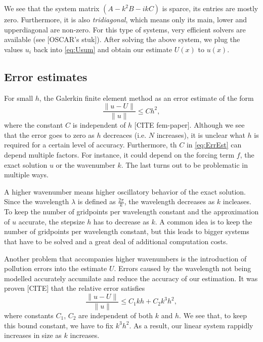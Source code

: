 \documentclass[a4paper]{article}
\begin{document}
We see that the system matrix $(A - k^2 B - i k C)$ is sparce, its
entries are mostly zero. Furthermore, it is also \emph{tridiagonal},
which means only its main, lower and upperdiagonal are non-zero. For
this type of systems, very efficient solvers are available (see
[OSCAR's stuk]). After solving the above system, we plug the values
$u_i$ back into \eqref{eq:Usum} and obtain our estimate $U(x)$ to
$u(x)$.

\subsection{Error estimates}

For small $h$, the Galerkin finite element method as an error estimate
of the form
\begin{equation} \label{eq:ErrEst}
  \frac{\lVert u - U \rVert}{\lVert u \rVert} \leq C h^2,
\end{equation}
where the constant $C$ is independent of $h$ \cite{}[CITE fem-paper].
Although we see that the error goes to zero as $h$ decreaces (i.e. $N$
increases), it is unclear what $h$ is required for a certain level of
accuracy. Furthermore, th $C$ in \eqref{eq:ErrEst} can depend multiple
factors. For instance, it could depend on the forcing term $f$, the
exact solution $u$ or the wavenumber $k$. The last turns out to be
problematic in multiple ways.

A higher wavenumber means higher oscillatory behavior of the exact
solution. Since the wavelength $\lambda$ is defined as
$\frac{2\pi}{k}$, the wavelength decreases as $k$ incleases. To keep
the number of gridpoints per wavelength constant and the approximation
of $u$ accurate, the stepsize $h$ has to decrease as $k$. A common
idea is to keep the number of gridpoints per wavelength constant, but
this leads to bigger systems that have to be solved and a great deal
of additional computation costs.

Another problem that accompanies higher wavenumbers is the
introduction of pollution errors into the estimate $U$. Errors caused
by the wavelength not being modelled accurately accumilate and reduce
the accuracy of our estimation. It was proven [CITE] that the relative
error satisfies
\begin{equation} \label{eq:ErrEstK}
  \frac{\lVert u - U \rVert}{\lVert u \rVert} \leq C_1 k h + C_2 k^3
  h^2,
\end{equation}
where constants $C_1$, $C_2$ are independent of both $k$ and $h$. We
see that, to keep this bound constant, we have to fix $k^3 h^2$. As a
result, our linear system rappidly increases in size as $k$ increases.
\end{document}
